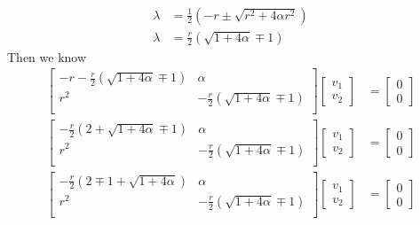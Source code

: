 \documentclass{article}
\begin{document}
\begin{solution}
\begin{align*}
\end{align*}
\begin{align*}
\lambda &= \frac{1}{2}\left( -r \pm \sqrt{r^{2} + 4\alpha r^{2}} \right)\\
\lambda &= \frac{r}{2}\left( \sqrt{1 + 4\alpha} \mp 1\right)
\end{align*}
Then we know
\begin{align*}
\begin{bmatrix}
-r - \frac{r}{2}\left( \sqrt{1 + 4\alpha} \mp 1\right)	&	\alpha		\\
r^{2}														&	-\frac{r}{2}\left( \sqrt{1 + 4\alpha} \mp 1\right)	\\
\end{bmatrix}
\begin{bmatrix}
v_{1}\\
v_{2}
\end{bmatrix}
&=
\begin{bmatrix}
0\\
0
\end{bmatrix}
\\
\begin{bmatrix}
-\frac{r}{2} \left( 2 + \sqrt{1 + 4\alpha} \mp 1\right)	&	\alpha		\\
r^{2}														&	-\frac{r}{2}\left( \sqrt{1 + 4\alpha} \mp 1\right)	\\
\end{bmatrix}
\begin{bmatrix}
v_{1}\\
v_{2}
\end{bmatrix}
&=
\begin{bmatrix}
0\\
0
\end{bmatrix}
\\
\begin{bmatrix}
-\frac{r}{2} \left( 2 \mp 1 + \sqrt{1 + 4\alpha}\right)	&	\alpha		\\
r^{2}														&	-\frac{r}{2}\left( \sqrt{1 + 4\alpha} \mp 1\right)	\\
\end{bmatrix}
\begin{bmatrix}
v_{1}\\
v_{2}
\end{bmatrix}
&=
\begin{bmatrix}
0\\
0
\end{bmatrix}
\\
\end{align*}


\end{solution}
\end{document}
